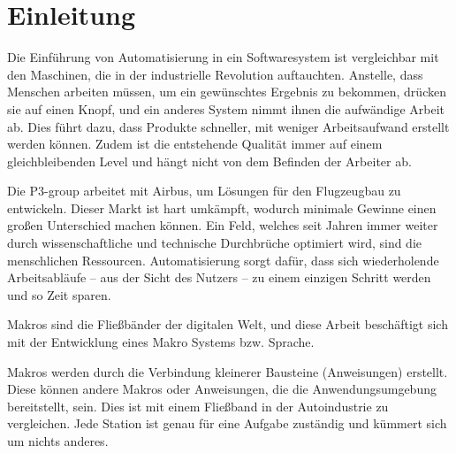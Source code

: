 

\pagebreak

\section{Einleitung}
\label{sec:Einleitung}
  Die Einführung von Automatisierung in ein Softwaresystem ist vergleichbar mit den Maschinen, die in der industrielle Revolution auftauchten. Anstelle, dass Menschen arbeiten müssen, um ein gewünschtes Ergebnis zu bekommen, drücken sie auf einen Knopf, und ein anderes System nimmt ihnen die aufwändige Arbeit ab. Dies führt dazu, dass Produkte schneller, mit weniger Arbeitsaufwand erstellt werden können. Zudem ist die entstehende Qualität immer auf einem gleichbleibenden Level und hängt nicht von dem Befinden der Arbeiter ab.

  Die P3-group arbeitet mit Airbus, um Lösungen für den Flugzeugbau zu entwickeln. Dieser Markt ist hart umkämpft, wodurch minimale Gewinne einen großen Unterschied machen können. Ein Feld, welches seit Jahren immer weiter durch wissenschaftliche und technische Durchbrüche optimiert wird, sind die menschlichen Ressourcen. Automatisierung sorgt dafür, dass sich wiederholende Arbeitsabläufe -- aus der Sicht des Nutzers -- zu einem einzigen Schritt werden und so Zeit sparen.

  Makros sind die Fließbänder der digitalen Welt, und diese Arbeit beschäftigt sich mit der Entwicklung eines Makro Systems bzw. Sprache.

  Makros werden durch die Verbindung kleinerer Bausteine (Anweisungen) erstellt. Diese können andere Makros oder Anweisungen, die die Anwendungsumgebung bereitstellt, sein. Dies ist mit einem Fließband in der Autoindustrie zu vergleichen. Jede Station ist genau für eine Aufgabe zuständig und kümmert sich um nichts anderes.

